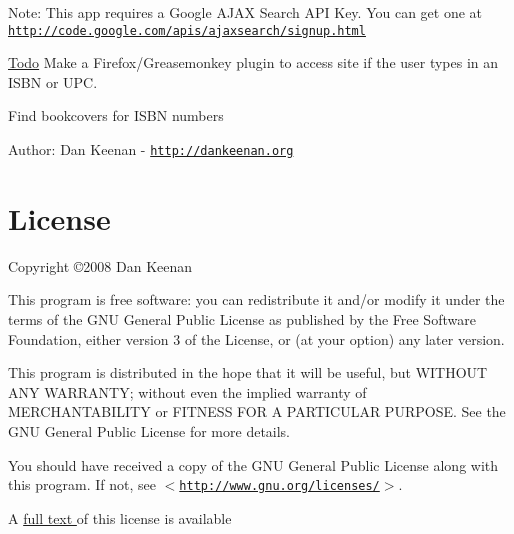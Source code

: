 \begin{Desc}
\item[Note:]This app requires a Google AJAX Search API Key. You can get one at \href{http://code.google.com/apis/ajaxsearch/signup.html}{\tt http://code.google.com/apis/ajaxsearch/signup.html}\end{Desc}
\begin{Desc}
\item[\hyperlink{todo__todo000001}{Todo}]Make a Firefox/Greasemonkey plugin to access site if the user types in an ISBN or UPC. 

Find bookcovers for ISBN numbers\end{Desc}
\begin{Desc}
\item[Author:]Dan Keenan - \href{http://dankeenan.org}{\tt http://dankeenan.org} \end{Desc}
\hypertarget{index_license}{}\section{License}\label{index_license}
Copyright \copyright 2008 Dan Keenan

This program is free software: you can redistribute it and/or modify it under the terms of the GNU General Public License as published by the Free Software Foundation, either version 3 of the License, or (at your option) any later version.

This program is distributed in the hope that it will be useful, but WITHOUT ANY WARRANTY; without even the implied warranty of MERCHANTABILITY or FITNESS FOR A PARTICULAR PURPOSE. See the GNU General Public License for more details.

You should have received a copy of the GNU General Public License along with this program. If not, see $<$\href{http://www.gnu.org/licenses/}{\tt http://www.gnu.org/licenses/}$>$.



A \hyperlink{license}{full text } of this license is available 